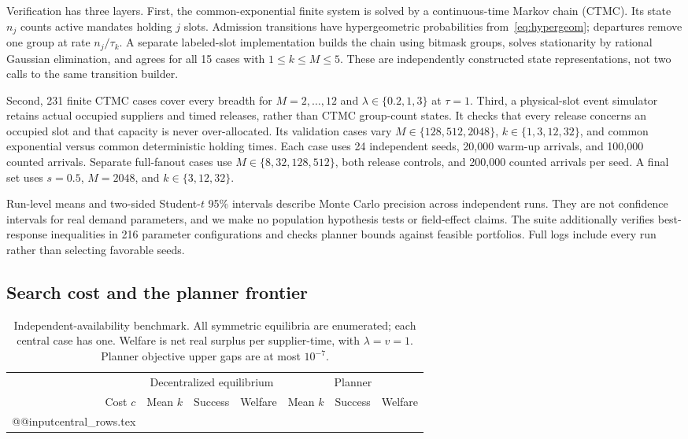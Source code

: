 \documentclass[11pt,a4paper]{article}
\begin{document}
Verification has three layers. First, the common-exponential finite system is solved by a continuous-time Markov chain (CTMC). Its state $n_j$ counts active mandates holding $j$ slots. Admission transitions have hypergeometric probabilities from~\eqref{eq:hypergeom}; departures remove one group at rate $n_j/\tau_k$. A separate labeled-slot implementation builds the chain using bitmask groups, solves stationarity by rational Gaussian elimination, and agrees for all 15 cases with $1\leq k\leq M\leq5$. These are independently constructed state representations, not two calls to the same transition builder.

Second, 231 finite CTMC cases cover every breadth for $M=2,\ldots,12$ and $\lambda\in\{0.2,1,3\}$ at $\tau=1$. Third, a physical-slot event simulator retains actual occupied suppliers and timed releases, rather than CTMC group-count states. It checks that every release concerns an occupied slot and that capacity is never over-allocated. Its validation cases vary $M\in\{128,512,2048\}$, $k\in\{1,3,12,32\}$, and common exponential versus common deterministic holding times. Each case uses 24 independent seeds, 20,000 warm-up arrivals, and 100,000 counted arrivals. Separate full-fanout cases use $M\in\{8,32,128,512\}$, both release controls, and 200,000 counted arrivals per seed. A final set uses $s=0.5$, $M=2048$, and $k\in\{3,12,32\}$.

Run-level means and two-sided Student-$t$ 95\% intervals describe Monte Carlo precision across independent runs. They are not confidence intervals for real demand parameters, and we make no population hypothesis tests or field-effect claims. The suite additionally verifies best-response inequalities in 216 parameter configurations and checks planner bounds against feasible portfolios. Full logs include every run rather than selecting favorable seeds.

\subsection{Search cost and the planner frontier}
\begin{table}[t]
\centering\small
\caption{Independent-availability benchmark. All symmetric equilibria are enumerated; each central case has one. Welfare is net real surplus per supplier-time, with $\lambda=v=1$. Planner objective upper gaps are at most $10^{-7}$.}
\label{tab:central}
\begin{tabular}{rrrrrrr}\toprule
&\multicolumn{3}{c}{Decentralized equilibrium}&\multicolumn{3}{c}{Planner}\\
\cmidrule(lr){2-4}\cmidrule(lr){5-7}
Cost $c$ & Mean $k$ & Success & Welfare & Mean $k$ & Success & Welfare\\\midrule
\csname @@input\endcsname central_rows.tex
\bottomrule\end{tabular}
\end{table}
\end{document}
